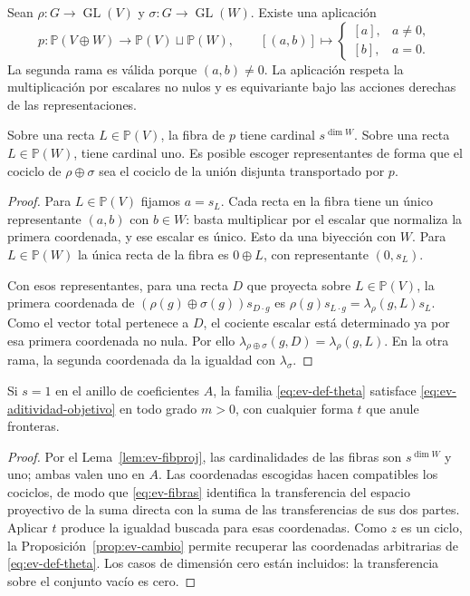Sean $\rho:G\to\operatorname{GL}(V)$ y $\sigma:G\to\operatorname{GL}(W)$. Existe una aplicación
\begin{equation}
 p:\mathbb P(V\oplus W)\longrightarrow\mathbb P(V)\sqcup\mathbb P(W),
 \qquad [(a,b)]\longmapsto
 \begin{cases}[a],& a\ne0,\\{}[b],&a=0.
 \end{cases}
 \label{eq:ev-proyeccion}
\end{equation}
La segunda rama es válida porque $(a,b)\ne0$. La aplicación respeta la multiplicación por escalares no nulos y es equivariante bajo las acciones derechas de las representaciones.

\begin{lema}
\label{lem:ev-fibproj}
Sobre una recta $L\in\mathbb P(V)$, la fibra de $p$ tiene cardinal $s^{\dim W}$. Sobre una recta $L\in\mathbb P(W)$, tiene cardinal uno. Es posible escoger representantes de forma que el cociclo de $\rho\oplus\sigma$ sea el cociclo de la unión disjunta transportado por $p$.
\end{lema}
\begin{proof}
Para $L\in\mathbb P(V)$ fijamos $a=s_L$. Cada recta en la fibra tiene un único representante $(a,b)$ con $b\in W$: basta multiplicar por el escalar que normaliza la primera coordenada, y ese escalar es único. Esto da una biyección con $W$. Para $L\in\mathbb P(W)$ la única recta de la fibra es $0\oplus L$, con representante $(0,s_L)$.

Con esos representantes, para una recta $D$ que proyecta sobre $L\in\mathbb P(V)$, la primera coordenada de $(\rho(g)\oplus\sigma(g))s_{D\cdot g}$ es $\rho(g)s_{L\cdot g}=\lambda_\rho(g,L)s_L$. Como el vector total pertenece a $D$, el cociente escalar está determinado ya por esa primera coordenada no nula. Por ello $\lambda_{\rho\oplus\sigma}(g,D)=\lambda_\rho(g,L)$. En la otra rama, la segunda coordenada da la igualdad con $\lambda_\sigma$.
\end{proof}

\begin{teorema}
\label{thm:ev-transfer-adit}
Si $s=1$ en el anillo de coeficientes $A$, la familia \eqref{eq:ev-def-theta} satisface \eqref{eq:ev-aditividad-objetivo} en todo grado $m>0$, con cualquier forma $t$ que anule fronteras.
\end{teorema}
\begin{proof}
Por el Lema~\ref{lem:ev-fibproj}, las cardinalidades de las fibras son $s^{\dim W}$ y uno; ambas valen uno en $A$. Las coordenadas escogidas hacen compatibles los cociclos, de modo que \eqref{eq:ev-fibras} identifica la transferencia del espacio proyectivo de la suma directa con la suma de las transferencias de sus dos partes. Aplicar $t$ produce la igualdad buscada para esas coordenadas. Como $z$ es un ciclo, la Proposición~\ref{prop:ev-cambio} permite recuperar las coordenadas arbitrarias de \eqref{eq:ev-def-theta}. Los casos de dimensión cero están incluidos: la transferencia sobre el conjunto vacío es cero.
\end{proof}

